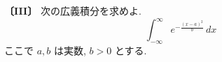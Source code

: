 \noindent\textbf{〔III〕}
次の広義積分を求めよ.
\[
\int_{-\infty}^{\infty} e^{-\frac{(x-a)^2}{b}}\,dx
\]
ここで $a,b$ は実数, $b>0$ とする.
